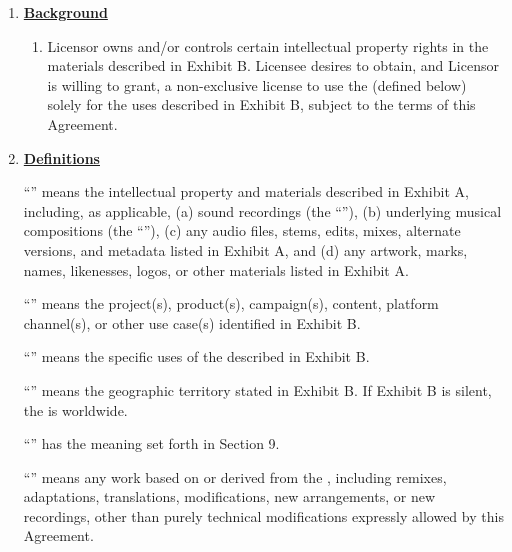 \begin{enumerate}[leftmargin=*, label=\arabic*.]

	\item \textbf{\uline{Background}}

	\begin{enumerate}[leftmargin=*, label=\Alph*.]
		\item Licensor owns and/or controls certain intellectual property rights in the
		materials described in Exhibit B. Licensee desires to obtain, and Licensor is willing
		to grant, a non-exclusive license to use the \licensedIP (defined below) solely for the
		uses described in Exhibit B, subject to the terms of this Agreement.
	\end{enumerate}

	\item \textbf{\uline{Definitions}}

	\par\medskip\noindent ``'' means the intellectual property and materials
	described in Exhibit A, including, as applicable, (a) sound recordings (the
	``''), (b) underlying musical compositions (the ``''),
	(c) any audio files, stems, edits, mixes, alternate versions, and metadata listed in
	Exhibit A, and (d) any artwork, marks, names, likenesses, logos, or other materials listed
	in Exhibit A.

	\par\medskip\noindent ``'' means the project(s), product(s), campaign(s),
	content, platform channel(s), or other use case(s) identified in Exhibit B.

	\par\medskip\noindent ``'' means the specific uses of the \licensedIP
	described in Exhibit B.

	\par\medskip\noindent ``'' means the geographic territory stated in
	Exhibit B. If Exhibit B is silent, the \territory is worldwide.

	\par\medskip\noindent ``'' has the meaning set forth in Section 9.

	\par\medskip\noindent ``'' means any work based on or derived from
	the \licensedIP, including remixes, adaptations, translations, modifications, new
	arrangements, or new recordings, other than purely technical modifications expressly
	allowed by this Agreement.


\end{enumerate}
